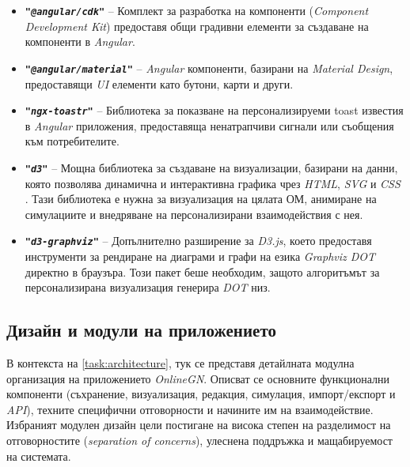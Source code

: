 \vspace{-0.3cm}

\begin{itemize}
	\item \texttt{\textbf{"\textit{@angular/cdk}"}} -- Комплект за разработка на компоненти (\textit{Component Development Kit}) предоставя общи градивни елементи за създаване на компоненти в \textit{Angular}.
	\item \texttt{\textbf{"\textit{@angular/material}"}} -- \textit{Angular} компоненти, базирани на \textit{Material Design}, предоставящи \textit{UI} елементи като бутони, карти и други.
	\item \texttt{\textbf{"\textit{ngx-toastr}"}} -- Библиотека за показване на персонализируеми toast известия в \textit{Angular} приложения, предоставяща ненатрапчиви сигнали или съобщения към потребителите.
	\item \texttt{\textbf{"\textit{d3}"}} -- Мощна библиотека за създаване на визуализации, базирани на данни, която позволява динамична и интерактивна графика чрез \textit{HTML}, \textit{SVG} и \textit{CSS} \cite{D3Transition}. Тази библиотека е нужна за визуализация на цялата ОМ, анимиране на симулациите и внедряване на персонализирани взаимодействия с нея.
	\item \texttt{\textbf{"\textit{d3-graphviz}"}} -- Допълнително разширение за \textit{D3.js}, което предоставя инструменти за рендиране на диаграми и графи на езика \textit{Graphviz DOT} директно в браузъра. Този пакет беше необходим, защото алгоритъмът за персонализирана визуализация генерира \textit{DOT} низ.
\end{itemize}

\vspace{0.35cm}

\subsection{Дизайн и модули на приложението}
\hspace*{2.5em}В контекста на \ref{task:architecture}, тук се представя детайлната модулна организация на приложението \textit{OnlineGN}. Описват се основните функционални компоненти (съхранение, визуализация, редакция, симулация, импорт/експорт и \textit{API}), техните специфични отговорности и начините им на взаимодействие. Избраният модулен дизайн цели постигане на висока степен на разделимост на отговорностите (\textit{separation of concerns}), улеснена поддръжка и мащабируемост на системата.

